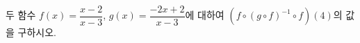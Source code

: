\hspace*{2mm}\begin{minipage}[t]{\dimexpr\linewidth-2mm\relax}\vspace{0pt}
두 함수 $f(x)=\dfrac{x-2}{x-3}$, $g(x)=\dfrac{-2x+2}{x-3}$에 대하여 $(f\circ(g\circ f)^{-1}\circ f)(4)$의 값을 구하시오.\end{minipage}
